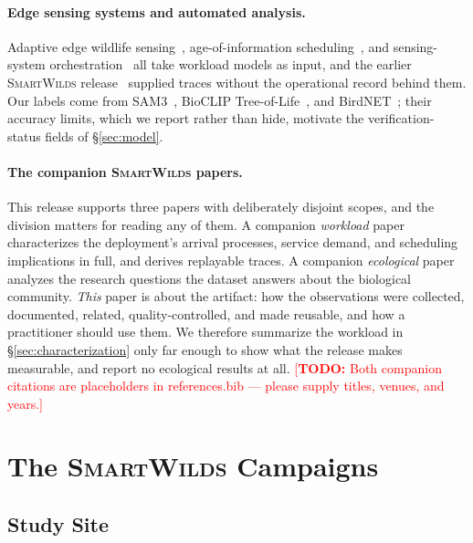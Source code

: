 \documentclass[sigconf]{acmart}
\newcommand{\smartwilds}{\textsc{SmartWilds}\xspace}
\newcommand{\TODO}[1]{\textcolor{red}{\footnotesize[\textbf{TODO:} #1]}}
\newcommand{\TODO}[1]{}
\begin{document}
\paragraph{Edge sensing systems and automated analysis.}
Adaptive edge wildlife
sensing~\cite{rastikerdar2026wildfit,Pestell2025SmartCamera},
age-of-information scheduling~\cite{huang2025ageofevent}, and
sensing-system orchestration~\cite{lin2025skyeye,liu2026eric} all take
workload models as input, and the earlier \smartwilds
release~\cite{kline2025smartwilds} supplied traces without the
operational record behind them. Our labels come from
SAM3~\cite{carion2026sam}, BioCLIP
Tree-of-Life~\cite{stevens2024bioclip,gu2025bioclip,treeoflife_200m},
and BirdNET~\cite{kahl2021birdnet,Besson2022Automated}; their accuracy
limits, which we report rather than hide, motivate the
verification-status fields of \S\ref{sec:model}.

\paragraph{The companion \smartwilds papers.}
This release supports three papers with deliberately disjoint scopes,
and the division matters for reading any of them. A companion
\emph{workload} paper~\cite{smartwilds_workload} characterizes the
deployment's arrival processes, service demand, and scheduling
implications in full, and derives replayable traces. A companion
\emph{ecological} paper~\cite{smartwilds_ecology} analyzes the research
questions the dataset answers about the biological community.
\emph{This} paper is about the artifact: how the observations were
collected, documented, related, quality-controlled, and made reusable,
and how a practitioner should use them. We therefore summarize the
workload in \S\ref{sec:characterization} only far enough to show what
the release makes measurable, and report no ecological results at all.
\TODO{Both companion citations are placeholders in references.bib ---
please supply titles, venues, and years.}

\section{The \smartwilds Campaigns}
\label{sec:campaign}

\subsection{Study Site}
\end{document}
